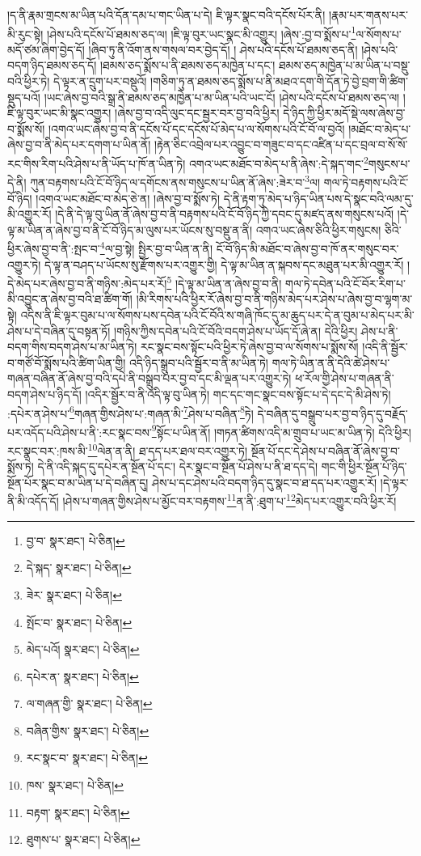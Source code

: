 །ད་ནི་རྣམ་གྲངས་མ་ཡིན་པའི་དོན་དམ་པ་གང་ཡིན་པ་དེ། ཇི་ལྟར་སྣང་བའི་དངོས་པོར་ནི། །རྣམ་པར་གནས་པར་མི་རུང་སྟེ། །ཤེས་པའི་དངོས་པོ་ཐམས་ཅད་ལ། །ཇི་ལྟ་བུར་ཡང་སྣང་མི་འགྱུར། །ཞེས་:བྱ་བ་སྨོས་པ་\footnote{བྱ་བ་  སྣར་ཐང་།  པེ་ཅིན། }ལ་སོགས་པ་མདོ་ཙམ་ཞིག་བྱེད་དོ། །ཞིབ་ཏུ་ནི་འོག་ནས་གསལ་བར་བྱེད་དོ། །
ཤེས་པའི་དངོས་པོ་ཐམས་ཅད་ནི། །ཤེས་པའི་བདག་ཉིད་ཐམས་ཅད་དོ། །ཐམས་ཅད་སྨོས་པ་ནི་ཐམས་ཅད་མཁྱེན་པ་དང་། ཐམས་ཅད་མཁྱེན་པ་མ་ཡིན་པ་བསྡུ་བའི་ཕྱིར་ཏེ། དེ་ལྟར་ན་དྲུག་པར་བསྡུའོ། །གཅིག་ཏུ་ན་ཐམས་ཅད་སྨོས་པ་ནི་མཐའ་དག་གི་དོན་ཏེ་བྱེ་བྲག་གི་ཚིག་སྡུད་པའོ། །ཡང་ཞེས་བྱ་བའི་སྒྲ་ནི་ཐམས་ཅད་མཁྱེན་པ་མ་ཡིན་པའི་ཡང་ངོ། །ཤེས་པའི་དངོས་པོ་ཐམས་ཅད་ལ། །ཇི་ལྟ་བུར་ཡང་མི་སྣང་འགྱུར། །ཞེས་བྱ་བ་འདི་ལུང་དང་སྦྱར་བར་བྱ་བའི་ཕྱིར། དེ་ཉིད་ཀྱི་ཕྱིར་མདོ་སྡེ་ལས་ཞེས་བྱ་བ་སྨོས་སོ། །འགའ་ཡང་ཞེས་བྱ་བ་ནི་དངོས་པོ་དང་དངོས་པོ་མེད་པ་ལ་སོགས་པའི་ངོ་བོ་ལ་བྱའོ། །མཐོང་བ་མེད་པ་ཞེས་བྱ་བ་ནི་མེད་པར་དགག་པ་ཡིན་ནོ། །རྟེན་ཅིང་འབྲེལ་པར་འབྱུང་བ་གཟུང་བ་དང་འཛིན་པ་དང་བྲལ་བ་སོ་སོ་རང་གིས་རིག་པའི་ཤེས་པ་ནི་ཡོད་པ་ཁོ་ན་ཡིན་ཏེ། འགའ་ཡང་མཐོང་བ་མེད་པ་ནི་ཞེས་:དེ་སྐད་གང་\footnote{དེ་སྐད་  སྣར་ཐང་།  པེ་ཅིན། }གསུངས་པ་དེ་ནི། ཀུན་བརྟགས་པའི་ངོ་བོ་ཉིད་ལ་དགོངས་ནས་གསུངས་པ་ཡིན་ནོ་ཞེས་:ཟེར་བ་\footnote{ཟེར་  སྣར་ཐང་།  པེ་ཅིན། }ལ། གལ་ཏེ་བརྟགས་པའི་ངོ་བོ་ཉིད། །འགའ་ཡང་མཐོང་བ་མེད་ཅེ་ན། །ཞེས་བྱ་བ་སྨོས་ཏེ། དེ་ནི་རྟག་ཏུ་མེད་པ་ཉིད་ཡིན་པས་དེ་སྣང་བའི་ལམ་དུ་མི་འགྱུར་རོ། །དེ་ནི་དེ་ལྟ་བུ་ཡིན་ནོ་ཞེས་བྱ་བ་ནི་བརྟགས་པའི་ངོ་བོ་ཉིད་ཀྱི་དབང་དུ་མཛད་ནས་གསུངས་པའོ། །དེ་ལྟ་མ་ཡིན་ན་ཞེས་བྱ་བ་ནི་ངོ་བོ་ཉིད་མ་ལུས་པར་ཡོངས་སུ་བསྡུ་ན་ནི། འགའ་ཡང་ཞེས་ཅིའི་ཕྱིར་གསུངས། ཅིའི་ཕྱིར་ཞེས་བྱ་བ་ནི་:སྤང་བ་\footnote{སྤོང་བ་  སྣར་ཐང་།  པེ་ཅིན། }ལ་བྱ་སྟེ། སྤྱིར་བྱ་བ་ཡིན་ན་ནི། ངོ་བོ་ཉིད་མི་མཐོང་བ་ཞེས་བྱ་བ་ཁོ་ནར་གསུང་བར་འགྱུར་ཏེ། དེ་ལྟ་ན་བཤད་པ་ཡོངས་སུ་རྫོགས་པར་འགྱུར་གྱི། དེ་ལྟ་མ་ཡིན་ན་སྐབས་དང་མཐུན་པར་མི་འགྱུར་རོ། །དེ་མེད་པར་ཞེས་བྱ་བ་ནི་གཉིས་:མེད་པར་རོ།\footnote{མེད་པའོ།  སྣར་ཐང་།  པེ་ཅིན། } །དེ་ལྟ་མ་ཡིན་ན་ཞེས་བྱ་བ་ནི། གལ་ཏེ་དབེན་པའི་ངོ་བོར་རིག་པ་མི་འབྱུང་ན་ཞེས་བྱ་བའི་ཐ་ཚིག་གོ། །མི་རིགས་པའི་ཕྱིར་རོ་ཞེས་བྱ་བ་ནི་གཉིས་མེད་པར་ཤེས་པ་ཞེས་བྱ་བ་ལྷག་མ་སྟེ། འདིས་ནི་ཇི་ལྟར་བུམ་པ་ལ་སོགས་པས་དབེན་པའི་ངོ་བོའི་ས་གཞི་ཁོང་དུ་མ་ཆུད་པར་དེ་ན་བུམ་པ་མེད་པར་མི་ཤེས་པ་དེ་བཞིན་དུ་བསྟན་ཏོ། །གཉིས་ཀྱིས་དབེན་པའི་ངོ་བོའི་བདག་ཤེས་པ་ཡོད་དོ་ཞེ་ན། དེའི་ཕྱིར། ཤེས་པ་ནི་བདག་གིས་བདག་ཤེས་པ་མ་ཡིན་ཏེ། རང་སྣང་བས་སྟོང་པའི་ཕྱིར་ཏེ་ཞེས་བྱ་བ་ལ་སོགས་པ་སྨོས་སོ། །འདི་ནི་སྦྱོར་བ་གཙོ་བོ་སྨོས་པའི་ཚིག་ཡིན་གྱི། འདི་ཉིད་སྒྲུབ་པའི་སྦྱོར་བ་ནི་མ་ཡིན་ཏེ། གལ་ཏེ་ཡིན་ན་ནི་དེའི་ཚེ་ཤེས་པ་གཞན་བཞིན་ནོ་ཞེས་བྱ་བའི་དཔེ་ནི་བསྒྲུབ་པར་བྱ་བ་དང་མི་ལྡན་པར་འགྱུར་ཏེ། ཕ་རོལ་གྱི་ཤེས་པ་གཞན་ནི་བདག་ཤེས་པ་ཉིད་དོ། །འདིར་སྦྱོར་བ་ནི་འདི་ལྟ་བུ་ཡིན་ཏེ། གང་དང་གང་སྣང་བས་སྟོང་པ་དེ་དང་དེ་མི་ཤེས་ཏེ། :དཔེར་ན་ཤེས་པ་\footnote{དཔེར་ན་  སྣར་ཐང་།  པེ་ཅིན། }གཞན་གྱིས་ཤེས་པ་:གཞན་མི་\footnote{ལ་གཞན་གྱི་  སྣར་ཐང་།  པེ་ཅིན། }ཤེས་པ་བཞིན་\footnote{བཞིན་གྱིས་  སྣར་ཐང་།  པེ་ཅིན། }ཏེ། དེ་བཞིན་དུ་བསྒྲུབ་པར་བྱ་བ་ཉིད་དུ་བརྗོད་པར་འདོད་པའི་ཤེས་པ་ནི་:རང་སྣང་བས་\footnote{རང་སྣང་བ་  སྣར་ཐང་།  པེ་ཅིན། }སྟོང་པ་ཡིན་ནོ། །གཏན་ཚིགས་འདི་མ་གྲུབ་པ་ཡང་མ་ཡིན་ཏེ། དེའི་ཕྱིར། རང་སྣང་བར་:ཁས་མི་\footnote{ཁས་  སྣར་ཐང་།  པེ་ཅིན། }ལེན་ན་ནི། ཐ་དད་པར་ཐལ་བར་འགྱུར་ཏེ། སྔོན་པོ་དང་དེ་ཤེས་པ་བཞིན་ནོ་ཞེས་བྱ་བ་སྨོས་ཏེ། དེ་ནི་འདི་སྐད་དུ་དཔེར་ན་སྔོན་པོ་དང་། དེར་སྣང་བ་སྔོན་པོ་ཤེས་པ་ནི་ཐ་དད་དེ། གང་གི་ཕྱིར་སྔོན་པོ་ཉིད་སྔོན་པོར་སྣང་བ་མ་ཡིན་པ་དེ་བཞིན་དུ། ཤེས་པ་དང་ཤེས་པའི་བདག་ཉིད་དུ་སྣང་བ་ཐ་དད་པར་འགྱུར་རོ། །དེ་ལྟར་ནི་མི་འདོད་དོ། །ཤེས་པ་གཞན་གྱིས་ཤེས་པ་མྱོང་བར་བརྟགས་\footnote{བརྟག་  སྣར་ཐང་།  པེ་ཅིན། }ན་ནི་:ཐུག་པ་\footnote{ཐུགས་པ་  སྣར་ཐང་།  པེ་ཅིན། }མེད་པར་འགྱུར་བའི་ཕྱིར་རོ། 